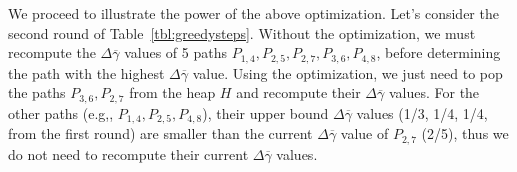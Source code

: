 \documentclass{sig-alternate}
\newcommand{\spath}{SP\xspace}
\begin{document}
We proceed to illustrate the power of the above optimization.
Let's consider the second round of Table~\ref{tbl:greedysteps}.
Without the optimization, we must recompute the $\Delta\overline{\gamma}$ values of 5 paths
$P_{1,4}, P_{2,5}, P_{2,7}, P_{3,6}, P_{4,8}$, before determining the path with the highest
$\Delta\overline{\gamma}$ value.
Using the optimization, we just need to pop the paths $P_{3,6}, P_{2,7}$ from the heap $H$ and recompute their
$\Delta\overline{\gamma}$ values.
For the other paths (e.g,, $P_{1,4}, P_{2,5}, P_{4,8}$),
their upper bound $\Delta\overline{\gamma}$ values (1/3, 1/4, 1/4, from the first round) are smaller than
the current $\Delta\overline{\gamma}$ value of $P_{2,7}$ (2/5), thus we do not need to recompute their current $\Delta\overline{\gamma}$ values.






%
%
%
\end{document}
